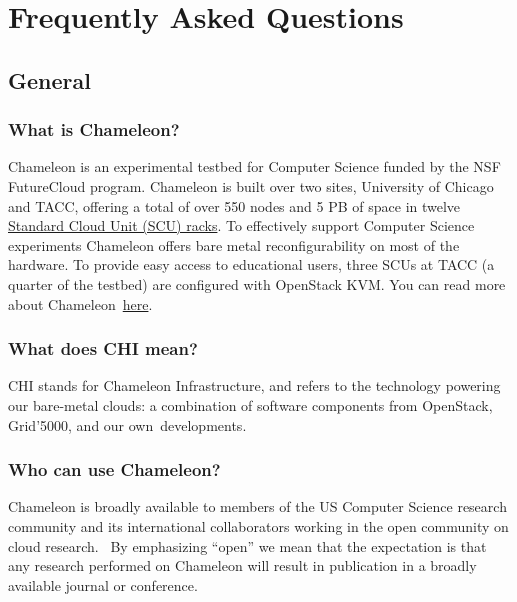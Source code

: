 \chapter{Frequently Asked Questions}\label{frequently-asked-questions}

\section{General}\label{general}

\subsection{What is Chameleon?}\label{what-is-chameleon}

Chameleon is an experimental testbed for Computer Science funded by the
NSF FutureCloud program. Chameleon is built over two sites, University
of Chicago and TACC, offering a total of over 550 nodes and 5 PB of
space in twelve
\href{https://www.chameleoncloud.org/about/hardware-description/}{Standard
Cloud Unit (SCU) racks}. To effectively support Computer Science
experiments Chameleon offers bare metal reconfigurability on most of the
hardware. To provide easy access to educational users, three SCUs at
TACC (a quarter of the testbed) are configured with OpenStack KVM. You
can read more about
Chameleon~\href{https://www.chameleoncloud.org/about/chameleon/}{here}.

\subsection{What does CHI mean?}\label{what-does-chi-mean}

CHI stands for Chameleon Infrastructure, and refers to the technology
powering our bare-metal clouds: a combination of software components
from OpenStack, Grid'5000, and our own~developments.

\subsection{Who can use Chameleon?}\label{who-can-use-chameleon}

Chameleon is broadly available to members of the US Computer Science
research community and its international collaborators working in the
open community on cloud research. ~By emphasizing ``open'' we mean that
the expectation is that any research performed on Chameleon will result
in publication in a broadly available journal or conference.~

